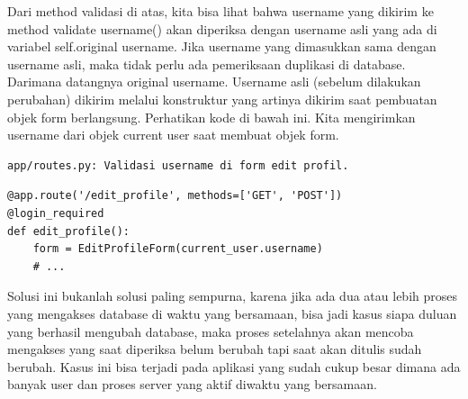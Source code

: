 Dari method validasi di atas, kita bisa lihat bahwa username yang dikirim ke method validate username() akan diperiksa dengan username asli yang ada di variabel self.original username. Jika username yang dimasukkan sama dengan username asli, maka tidak perlu ada pemeriksaan duplikasi di database. Darimana datangnya original username.
Username asli (sebelum dilakukan perubahan) dikirim melalui konstruktur yang artinya dikirim saat pembuatan objek form berlangsung. Perhatikan kode di bawah ini. Kita mengirimkan username dari objek current user saat membuat objek form. 
\begin{verbatim}
app/routes.py: Validasi username di form edit profil.
\end{verbatim}

\begin{verbatim}
@app.route('/edit_profile', methods=['GET', 'POST'])
@login_required
def edit_profile():
    form = EditProfileForm(current_user.username)
    # ...
\end{verbatim}
Solusi ini bukanlah solusi paling sempurna, karena jika ada dua atau lebih proses yang mengakses database di waktu yang bersamaan, bisa jadi kasus siapa duluan yang berhasil mengubah database, maka proses setelahnya akan mencoba mengakses yang saat diperiksa belum berubah tapi saat akan ditulis sudah berubah. Kasus ini bisa terjadi pada aplikasi yang sudah cukup besar dimana ada banyak user dan proses server yang aktif diwaktu yang bersamaan.


